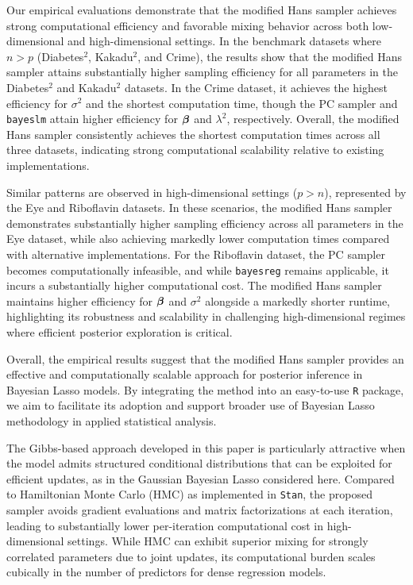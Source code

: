 Our empirical evaluations demonstrate that the modified Hans sampler achieves strong 
computational efficiency and favorable mixing behavior across both low-dimensional and 
high-dimensional settings. In the benchmark datasets where $n > p$ (Diabetes$^2$, 
Kakadu$^2$, and Crime), the results show that the modified Hans sampler attains 
substantially higher sampling efficiency for all parameters in the Diabetes$^2$ and 
Kakadu$^2$ datasets. In the Crime dataset, it achieves the highest efficiency for 
$\sigma^2$ and the shortest computation time, though the PC sampler and 
\texttt{bayeslm} attain higher efficiency for ${\boldsymbol \beta}$ and $\lambda^2$, respectively. 
Overall, the modified Hans sampler consistently achieves the shortest computation 
times across all three datasets, indicating strong computational scalability relative 
to existing implementations.

Similar patterns are observed in high-dimensional settings ($p > n$), represented by 
the Eye and Riboflavin datasets. In these scenarios, the modified Hans sampler 
demonstrates substantially higher sampling efficiency across all parameters in the 
Eye dataset, while also achieving markedly lower computation times compared with 
alternative implementations. For the Riboflavin dataset, the PC sampler becomes 
computationally infeasible, and while \texttt{bayesreg} remains applicable, it 
incurs a substantially higher computational cost. The modified Hans sampler maintains 
higher efficiency for ${\boldsymbol \beta}$ and $\sigma^2$ alongside a markedly shorter runtime, 
highlighting its robustness and scalability in challenging high-dimensional regimes 
where efficient posterior exploration is critical.

Overall, the empirical results suggest that the modified Hans sampler provides an 
effective and computationally scalable approach for posterior inference in Bayesian 
Lasso models. By integrating the method into an easy-to-use \texttt{R} package, we 
aim to facilitate its adoption and support broader use of Bayesian Lasso methodology 
in applied statistical analysis.

The Gibbs-based approach developed in this paper is particularly attractive when the model admits structured conditional distributions that can be exploited for efficient updates, as in the Gaussian Bayesian Lasso considered here. Compared to Hamiltonian Monte Carlo (HMC) as implemented in \texttt{Stan}, the proposed sampler avoids gradient evaluations and matrix factorizations at each iteration, leading to substantially lower per-iteration computational cost in high-dimensional settings. While HMC can exhibit superior mixing for strongly correlated parameters due to joint updates, its computational burden scales cubically in the number of predictors for dense regression models. 

